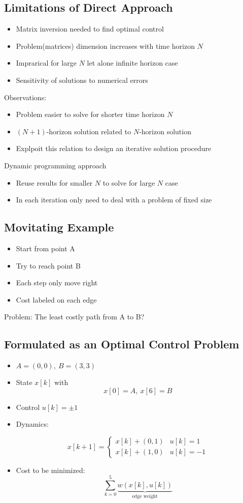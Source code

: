 \documentclass[10pt,a4paper,oneside]{article}
\begin{document}
\subsection{Limitations of Direct Approach}
\begin{itemize}
\item Matrix inversion needed to find optimal control
\item Problem(matrices) dimension increases with time horizon $N$
\item Imprarical for large $N$ let alone infinite horizon case
\item Sensitivity of solutions to numerical errors

\end{itemize}
Observations:
\begin{itemize}
\item Problem easier to solve for shorter time horizon $N$
\item $(N+1)$-horizon solution related to $N$-horizon solution
\item Explpoit this relation to design an iterative solution procedure
\end{itemize}
Dynamic programming approach
\begin{itemize}
\item Reuse results for smaller $N$ to solve for large $N$ case
\item In each iteration only need to deal with a problem of fixed size
\end{itemize}
\subsection{Movitating Example}
\begin{itemize}
\item Start from point A
\item Try to reach point B
\item Each step only move right
\item Cost labeled on each edge
\end{itemize}
Problem: The least costly path from A to B?
\subsection{Formulated as an Optimal Control Problem}
\begin{itemize}
\item $A=(0, 0),\ B=(3, 3)$
\item State $x[k]$ with
\[
x[0]=A,\ x[6]=B
\]
\item Control $u[k]=\pm1$
\item Dynamics:

$$
x[k+1]=\left\{\begin{array}{ll}{x[k]+(0,1)} & {u[k]=1} \\ {x[k]+(1,0)} & {u[k]=-1}\end{array}\right.
$$
\item Cost to be minimized:
\[
\sum_{k=0}^{5} \underbrace{w(x[k], u[k])}_{\text { edge weight }}
\]
\end{itemize}
\end{document}
